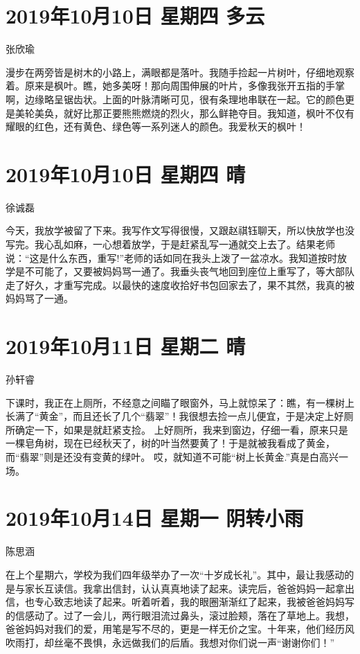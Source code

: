 \section{2019年10月10日 星期四 多云}

张欣瑜

漫步在两旁皆是树木的小路上，满眼都是落叶。我随手捡起一片树叶，仔细地观察着。原来是枫叶。瞧，她多美呀！那向周围伸展的叶片，多像我张开五指的手掌啊，边缘略呈锯齿状。上面的叶脉清晰可见，很有条理地串联在一起。它的颜色更是美轮美奂，就好比那正要熊熊燃烧的烈火，那么鲜艳夺目。我知道，枫叶不仅有耀眼的红色，还有黄色、绿色等一系列迷人的颜色。我爱秋天的枫叶！

\section{2019年10月10日 星期四 晴}

徐诚磊

今天，我放学被留了下来。我写作文写得很慢，又跟赵祺钰聊天，所以快放学也没写完。我心乱如麻，一心想着放学，于是赶紧乱写一通就交上去了。结果老师说：``这是什么东西，重写!''老师的话如同在我头上泼了一盆凉水。我知道按时放学是不可能了，又要被妈妈骂一通了。我垂头丧气地回到座位上重写了，等大部队走了好久，才重写完成。以最快的速度收拾好书包回家去了，果不其然，我真的被妈妈骂了一通。

\section{2019年10月11日 星期二 晴}

孙轩睿

下课时，我正在上厕所，不经意之间瞄了眼窗外，马上就惊呆了：瞧，有一棵树上长满了``黄金''，而且还长了几个``翡翠''！我很想去捡一点儿便宜，于是决定上好厕所确定一下，如果是就赶紧支捡。
上好厕所，我来到窗边，仔细一看，原来只是一棵皂角树，现在已经秋天了，树的叶当然要黄了！于是就被我看成了黄金，而``翡翠''则是还没有变黄的绿叶。
哎，就知道不可能``树上长黄金.''真是白高兴一场。

\section{2019年10月14日 星期一 阴转小雨}

陈思涵

在上个星期六，学校为我们四年级举办了一次``十岁成长礼''。其中，最让我感动的是与家长互读信。我拿出信封，认认真真地读了起来。读完后，爸爸妈妈一起拿出信，也专心致志地读了起来。听着听着，我的眼圈渐渐红了起来，我被爸爸妈妈写的信感动了。过了一会儿，两行眼泪流过鼻头，滚过脸颊，落在了草地上。我想，爸爸妈妈对我们的爱，用笔是写不尽的，更是一样无价之宝。十年来，他们经历风吹雨打，却丝毫不畏惧，永远做我们的后盾。我想对你们说一声``谢谢你们！''


